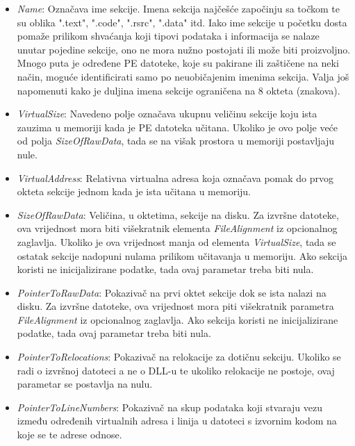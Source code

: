 \documentclass[times, utf8, diplomski, numeric]{fer}
\begin{document}
\begin{itemize}

\item \emph{Name}: Označava ime sekcije. Imena sekcija najčešće
započinju sa točkom te su oblika ".text", ".code", ".rsrc",
".data" itd. Iako ime sekcije u početku dosta pomaže prilikom
shvaćanja koji tipovi podataka i informacija se nalaze unutar
pojedine sekcije, ono ne mora nužno postojati ili može biti
proizvoljno. Mnogo puta je određene PE datoteke, koje su pakirane
ili zaštičene na neki način, moguće identificirati samo po
neuobičajenim imenima sekcija. Valja još napomenuti kako je
duljina imena sekcije ograničena na 8 okteta (znakova).

\item \emph{VirtualSize}: Navedeno polje označava ukupnu veličinu
sekcije koju ista zauzima u memoriji kada je PE datoteka učitana.
Ukoliko je ovo polje veće od polja \emph{SizeOfRawData}, tada se
na višak prostora u memoriji postavljaju nule.

\item \emph{VirtualAddress}: Relativna virtualna adresa koja
označava pomak do prvog okteta sekcije jednom kada je ista
učitana u memoriju.

\item \emph{SizeOfRawData}: Veličina, u oktetima, sekcije na
disku. Za izvršne datoteke, ova vrijednost mora biti višekratnik
elementa \emph{FileAlignment} iz opcionalnog zaglavlja. Ukoliko
je ova vrijednost manja od elementa \emph{VirtualSize}, tada se
ostatak sekcije nadopuni nulama prilikom učitavanja u memoriju.
Ako sekcija koristi ne inicijalizirane podatke, tada ovaj
parametar treba biti nula.

\item \emph{PointerToRawData}: Pokazivač na prvi oktet sekcije
dok se ista nalazi na disku. Za izvršne datoteke, ova vrijednost
mora piti višekratnik parametra \emph{FileAlignment} iz
opcionalnog zaglavlja. Ako sekcija koristi ne inicijalizirane
podatke, tada ovaj parametar treba biti nula.

\item \emph{PointerToRelocations}: Pokazivač na relokacije za
dotičnu sekciju. Ukoliko se radi o izvršnoj datoteci a ne o DLL-u
te ukoliko relokacije ne postoje, ovaj parametar se postavlja na
nulu.

\item \emph{PointerToLineNumbers}: Pokazivač na skup podataka
koji stvaraju vezu između određenih virtualnih adresa i linija u
datoteci s izvornim kodom na koje se te adrese odnose.


\end{itemize}
\end{document}
